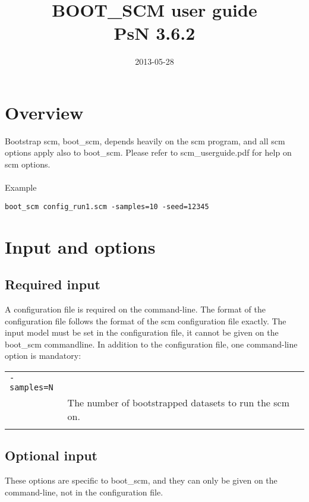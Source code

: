 \documentclass[a4paper,12pt]{article}
\title{BOOT\_SCM user guide\\ \vspace{2 mm} {\large PsN 3.6.2}}
\date{2013-05-28}
\begin{document}
\maketitle


\section{Overview}

Bootstrap scm, boot\_scm, depends heavily on the scm program, and all scm options apply also to boot\_scm. Please refer to scm\_userguide.pdf for help on scm options.
\\
\\
Example
\begin{verbatim}
boot_scm config_run1.scm -samples=10 -seed=12345
\end{verbatim}

\section{Input and options}

\subsection{Required input}

A configuration file is required on the command-line. The format of the configuration file follows the format of the scm configuration file exactly. The input model must be set in the configuration file, it cannot be given on the boot\_scm commandline. In addition to the configuration file, one command-line option is mandatory:

\begin{longtable}{p{1in}p{4in}}
\verb|-samples=N| & \\
\nopagebreak
 & The number of bootstrapped datasets to run the scm on. \\
\\
\end{longtable}


\subsection{Optional input}

These options are specific to boot\_scm, and they can only be given on the command-line, not in the configuration file.
\end{document}
